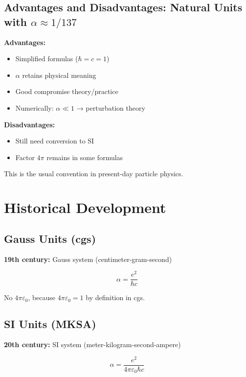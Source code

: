 	\subsection{Advantages and Disadvantages: Natural Units with $\alpha \approx 1/137$}
	
	\textbf{Advantages:}
	\begin{itemize}
		\item Simplified formulas ($\hbar = c = 1$)
		\item $\alpha$ retains physical meaning
		\item Good compromise theory/practice
		\item Numerically: $\alpha \ll 1$ → perturbation theory
	\end{itemize}
	
	\textbf{Disadvantages:}
	\begin{itemize}
		\item Still need conversion to SI
		\item Factor $4\pi$ remains in some formulas
	\end{itemize}
	
	This is the usual convention in present-day particle physics.
	
	\section{Historical Development}
	
	\subsection{Gauss Units (cgs)}
	
	\textbf{19th century:} Gauss system (centimeter-gram-second)
	
	\begin{equation}
		\alpha = \frac{e^2}{\hbar c}
	\end{equation}
	
	No $4\pi\varepsilon_0$, because $4\pi\varepsilon_0 = 1$ by definition in cgs.
	
	\subsection{SI Units (MKSA)}
	
	\textbf{20th century:} SI system (meter-kilogram-second-ampere)
	
	\begin{equation}
		\alpha = \frac{e^2}{4\pi\varepsilon_0\hbar c}
	\end{equation}
	
